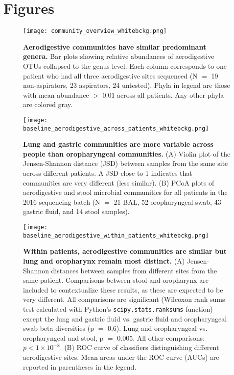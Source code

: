 \FloatBarrier
\newpage


\section{Figures}

\begin{figure}[h]
        \begin{center}
        \texttt{[image: community\_overview\_whitebckg.png]}
        \caption{\textbf{Aerodigestive communities have similar predominant genera.} Bar plots showing relative abundances of aerodigestive OTUs collapsed to the genus level. Each column corresponds to one patient who had all three aerodigestive sites sequenced (N $=$ 19 non-aspirators, 23 aspirators, 24 untested). Phyla in legend are those with mean abundance $>$ 0.01 across all patients. Any other phyla are colored gray.}
        \label{fig1}
        \end{center}
\end{figure}

\begin{figure}[h]
        \begin{center}
        \texttt{[image: baseline\_aerodigestive\_across\_patients\_whitebckg.png]}
        \caption{\textbf{Lung and gastric communities are more variable across people than oropharyngeal communities.} (A) Violin plot of the Jensen-Shannon distance (JSD) between samples from the same site across different patients. A JSD close to 1 indicates that communities are very different (less similar). (B) PCoA plots of aerodigestive and stool microbial communities for all patients in the 2016 sequencing batch (N $=$ 21 BAL, 52 oropharyngeal swab, 43 gastric fluid, and 14 stool samples).}
        \label{fig2}
        \end{center}
\end{figure}

\begin{figure}[h]
        \begin{center}
        \texttt{[image: baseline\_aerodigestive\_within\_patients\_whitebckg.png]}
        \caption{\textbf{Within patients, aerodigestive communities are similar but lung and oropharynx remain most distinct.} (A) Jensen-Shannon distances between samples from different sites from the same patient. Comparisons between stool and oropharynx are included to contextualize these results, as these are expected to be very different. All comparisons are significant (Wilcoxon rank sums test calculated with Python's \texttt{scipy.stats.ranksums} function) except the lung and gastric fluid vs. gastric fluid and oropharyngeal swab beta diversities (p $=$ 0.6). Lung and oropharyngeal vs. oropharyngeal and stool, p $=$ 0.005. All other comparisons:  $p < 1 \times 10^{-8}$. (B) ROC curve of classifiers distinguishing different aerodigestive sites. Mean areas under the ROC curve (AUCs) are reported in parentheses in the legend.}
        \label{fig3}
        \end{center}
\end{figure}

